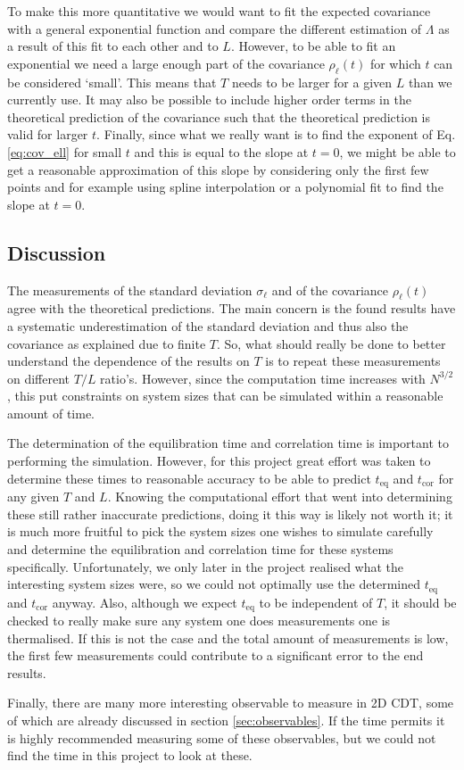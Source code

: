To make this more quantitative we would want to fit the expected covariance with a general exponential function and compare the different estimation of $\Lambda$ as a result of this fit to each other and to $L$.
However, to be able to fit an exponential we need a large enough part of the covariance $\rho_\ell(t)$ for which $t$ can be considered `small'.
This means that $T$ needs to be larger for a given $L$ than we currently use.
It may also be possible to include higher order terms in the theoretical prediction of the covariance such that the theoretical prediction is valid for larger $t$.
Finally, since what we really want is to find the exponent of Eq. \eqref{eq:cov_ell} for small $t$ and this is equal to the slope at $t = 0$, we might be able to get a reasonable approximation of this slope by considering only the first few points and for example using spline interpolation or a polynomial fit to find the slope at $t=0$.

% 


\subsection{Discussion}
The measurements of the standard deviation $\sigma_\ell$ and of the covariance $\rho_\ell(t)$ agree with the theoretical predictions.
The main concern is the found results have a systematic underestimation of the standard deviation and thus also the covariance as explained due to finite $T$.
So, what should really be done to better understand the dependence of the results on $T$ is to repeat these measurements on different $T/L$ ratio's.
However, since the computation time increases with $N^{3/2}$, this put constraints on system sizes that can be simulated within a reasonable amount of time.

The determination of the equilibration time and correlation time is important to performing the simulation.
However, for this project great effort was taken to determine these times to reasonable accuracy to be able to predict $t_\text{eq}$ and $t_\text{cor}$ for any given $T$ and $L$.
Knowing the computational effort that went into determining these still rather inaccurate predictions, doing it this way is likely not worth it; it is much more fruitful to pick the system sizes one wishes to simulate carefully and determine the equilibration and correlation time for these systems specifically.
Unfortunately, we only later in the project realised what the interesting system sizes were, so we could not optimally use the determined $t_\text{eq}$ and $t_\text{cor}$ anyway.
Also, although we expect $t_\text{eq}$ to be independent of $T$, it should be checked to really make sure any system one does measurements one is thermalised.
If this is not the case and the total amount of measurements is low, the first few measurements could contribute to a significant error to the end results.

Finally, there are many more interesting observable to measure in 2D CDT, some of which are already discussed in section \ref{sec:observables}.
If the time permits it is highly recommended measuring some of these observables, but we could not find the time in this project to look at these.